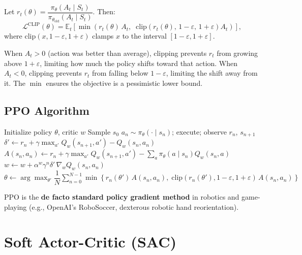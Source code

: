 \documentclass[11pt,a4paper]{article}
\theoremstyle{definition}
\theoremstyle{plain}
\theoremstyle{remark}
\begin{document}
\begin{tcolorbox}[colback=blue!5!white,colframe=blue!75!black,title=\textbf{PPO Clipped Objective}]
Let $r_t(\theta) = \dfrac{\pi_\theta(A_t \mid S_t)}{\pi_{\theta_{\mathrm{old}}}(A_t \mid S_t)}$. Then:
\[
    \mathcal{L}^{\mathrm{CLIP}}(\theta) = \mathbb{E}_t\!\left[\min\!\left(r_t(\theta)\, A_t,\;\; \mathrm{clip}\!\left(r_t(\theta),\, 1-\varepsilon,\, 1+\varepsilon\right) A_t\right)\right],
\]
where $\mathrm{clip}(x, 1-\varepsilon, 1+\varepsilon)$ clamps $x$ to the interval $[1-\varepsilon, 1+\varepsilon]$.
\end{tcolorbox}

When $A_t > 0$ (action was better than average), clipping prevents $r_t$ from growing above $1+\varepsilon$, limiting how much the policy shifts toward that action. When $A_t < 0$, clipping prevents $r_t$ from falling below $1-\varepsilon$, limiting the shift away from it. The $\min$ ensures the objective is a pessimistic lower bound.

\subsection{PPO Algorithm}

\begin{algorithm}
\caption{Proximal Policy Optimization (PPO)}
\begin{algorithmic}
\STATE Initialize policy $\theta$, critic $w$
    \STATE Sample $s_0$
        \STATE $a_n \sim \pi_\theta(\cdot \mid s_n)$; execute; observe $r_n$, $s_{n+1}$
        \STATE $\delta' \leftarrow r_n + \gamma\max_{a'} Q_w(s_{n+1}, a') - Q_w(s_n, a_n)$
        \STATE $A(s_n, a_n) \leftarrow r_n + \gamma\max_{a'} Q_w(s_{n+1}, a') - \sum_a \pi_\theta(a \mid s_n) Q_w(s_n, a)$
        \STATE $w \leftarrow w + \alpha^w \gamma^n \delta'\, \nabla_w Q_w(s_n, a_n)$
    \ENDFOR
    \STATE $\theta \leftarrow \arg\max_{\theta'} \dfrac{1}{N}\sum_{n=0}^{N-1} \min\!\left\{r_n(\theta')\, A(s_n, a_n),\; \mathrm{clip}(r_n(\theta'), 1-\varepsilon, 1+\varepsilon)\, A(s_n, a_n)\right\}$
\ENDWHILE
\end{algorithmic}
\end{algorithm}

PPO is the \textbf{de facto standard policy gradient method} in robotics and game-playing (e.g., OpenAI's RoboSoccer, dexterous robotic hand reorientation).

\section{Soft Actor-Critic (SAC)}
\end{document}

